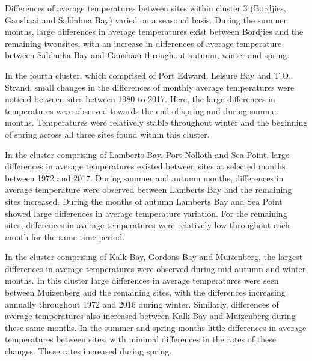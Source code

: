 \documentclass[12pt,A4paper,]{article}
\begin{document}
Differences of average temperatures between sites within cluster 3
(Bordjies, Gansbaai and Saldahna Bay) varied on a seasonal basis. During
the summer months, large differences in average temperatures exist
between Bordjies and the remaining twonsites, with an increase in
differences of average temperature between Saldanha Bay and Gansbaai
throughout autumn, winter and spring.

In the fourth cluster, which comprised of Port Edward, Leisure Bay and
T.O. Strand, small changes in the differences of monthly average
temperatures were noticed between sites between 1980 to 2017. Here, the
large differences in temperatures were observed towards the end of
spring and during summer months. Temperatures were relatively stable
throughout winter and the beginning of spring across all three sites
found within this cluster.

In the cluster comprising of Lamberts Bay, Port Nolloth and Sea Point,
large differences in average temperatures existed between sites at
selected months between 1972 and 2017. During summer and autumn months,
differences in average temperature were observed between Lamberts Bay
and the remaining sites increased. During the months of autumn Lamberts
Bay and Sea Point showed large differences in average temperature
variation. For the remaining sites, differences in average temperatures
were relatively low throughout each month for the same time period.

In the cluster comprising of Kalk Bay, Gordons Bay and Muizenberg, the
largest differences in average temperatures were observed during mid
autumn and winter months. In this cluster large differences in average
temperatures were seen between Muizenberg and the remaining sites, with
the differences increasing annually throughout 1972 and 2016 during
winter. Similarly, differences of average temperatures also increased
between Kalk Bay and Muizenberg during these same months. In the summer
and spring months little differences in average temperatures between
sites, with minimal differences in the rates of these changes. These
rates increased during spring.
\end{document}

